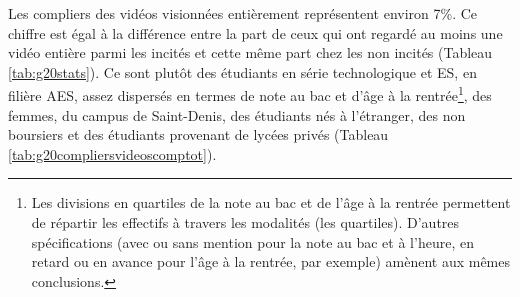 \documentclass[
]{book}
\begin{document}
Les compliers des vidéos visionnées entièrement représentent environ 7\%. Ce chiffre est égal à la différence entre la part de ceux qui ont regardé au moins une vidéo entière parmi les incités et cette même part chez les non incités (Tableau \ref{tab:g20stats}). Ce sont plutôt des étudiants en série technologique et ES, en filière AES, assez dispersés en termes de note au bac et d'âge à la rentrée\footnote{Les divisions en quartiles de la note au bac et de l'âge à la rentrée permettent de répartir les effectifs à travers les modalités (les quartiles). D'autres spécifications (avec ou sans mention pour la note au bac et à l'heure, en retard ou en avance pour l'âge à la rentrée, par exemple) amènent aux mêmes conclusions.}, des femmes, du campus de Saint-Denis, des étudiants nés à l'étranger, des non boursiers et des étudiants provenant de lycées privés (Tableau \ref{tab:g20compliersvideoscomptot}).

\newpage
\begingroup\fontsize{8}{10}\selectfont
\end{document}
